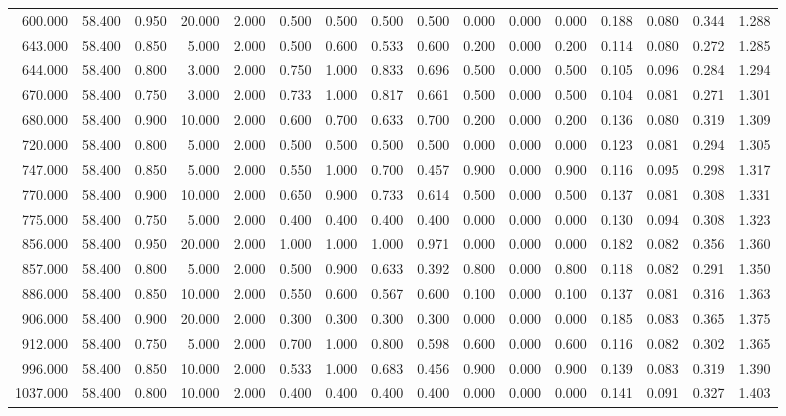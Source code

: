 \begin{tabular}{rrrrrrrrrrrrrrrr}
600.000 & 58.400 & 0.950 & 20.000 & 2.000 & 0.500 & 0.500 & 0.500 & 0.500 & 0.000 & 0.000 & 0.000 & 0.188 & 0.080 & 0.344 & 1.288 \\
643.000 & 58.400 & 0.850 & 5.000 & 2.000 & 0.500 & 0.600 & 0.533 & 0.600 & 0.200 & 0.000 & 0.200 & 0.114 & 0.080 & 0.272 & 1.285 \\
644.000 & 58.400 & 0.800 & 3.000 & 2.000 & 0.750 & 1.000 & 0.833 & 0.696 & 0.500 & 0.000 & 0.500 & 0.105 & 0.096 & 0.284 & 1.294 \\
670.000 & 58.400 & 0.750 & 3.000 & 2.000 & 0.733 & 1.000 & 0.817 & 0.661 & 0.500 & 0.000 & 0.500 & 0.104 & 0.081 & 0.271 & 1.301 \\
680.000 & 58.400 & 0.900 & 10.000 & 2.000 & 0.600 & 0.700 & 0.633 & 0.700 & 0.200 & 0.000 & 0.200 & 0.136 & 0.080 & 0.319 & 1.309 \\
720.000 & 58.400 & 0.800 & 5.000 & 2.000 & 0.500 & 0.500 & 0.500 & 0.500 & 0.000 & 0.000 & 0.000 & 0.123 & 0.081 & 0.294 & 1.305 \\
747.000 & 58.400 & 0.850 & 5.000 & 2.000 & 0.550 & 1.000 & 0.700 & 0.457 & 0.900 & 0.000 & 0.900 & 0.116 & 0.095 & 0.298 & 1.317 \\
770.000 & 58.400 & 0.900 & 10.000 & 2.000 & 0.650 & 0.900 & 0.733 & 0.614 & 0.500 & 0.000 & 0.500 & 0.137 & 0.081 & 0.308 & 1.331 \\
775.000 & 58.400 & 0.750 & 5.000 & 2.000 & 0.400 & 0.400 & 0.400 & 0.400 & 0.000 & 0.000 & 0.000 & 0.130 & 0.094 & 0.308 & 1.323 \\
856.000 & 58.400 & 0.950 & 20.000 & 2.000 & 1.000 & 1.000 & 1.000 & 0.971 & 0.000 & 0.000 & 0.000 & 0.182 & 0.082 & 0.356 & 1.360 \\
857.000 & 58.400 & 0.800 & 5.000 & 2.000 & 0.500 & 0.900 & 0.633 & 0.392 & 0.800 & 0.000 & 0.800 & 0.118 & 0.082 & 0.291 & 1.350 \\
886.000 & 58.400 & 0.850 & 10.000 & 2.000 & 0.550 & 0.600 & 0.567 & 0.600 & 0.100 & 0.000 & 0.100 & 0.137 & 0.081 & 0.316 & 1.363 \\
906.000 & 58.400 & 0.900 & 20.000 & 2.000 & 0.300 & 0.300 & 0.300 & 0.300 & 0.000 & 0.000 & 0.000 & 0.185 & 0.083 & 0.365 & 1.375 \\
912.000 & 58.400 & 0.750 & 5.000 & 2.000 & 0.700 & 1.000 & 0.800 & 0.598 & 0.600 & 0.000 & 0.600 & 0.116 & 0.082 & 0.302 & 1.365 \\
996.000 & 58.400 & 0.850 & 10.000 & 2.000 & 0.533 & 1.000 & 0.683 & 0.456 & 0.900 & 0.000 & 0.900 & 0.139 & 0.083 & 0.319 & 1.390 \\
1037.000 & 58.400 & 0.800 & 10.000 & 2.000 & 0.400 & 0.400 & 0.400 & 0.400 & 0.000 & 0.000 & 0.000 & 0.141 & 0.091 & 0.327 & 1.403 \\

\end{tabular}
